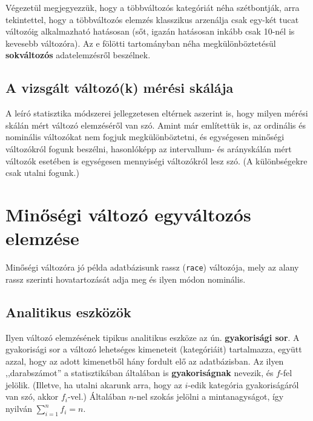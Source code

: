 \documentclass[]{book}
\begin{document}
Végezetül megjegyezzük, hogy a többváltozós kategóriát néha szétbontják, arra tekintettel, hogy a többváltozós elemzés klasszikus arzenálja csak egy-két tucat változóig alkalmazható hatásosan (sőt, igazán hatásosan inkább csak 10-nél is kevesebb változóra). Az e fölötti tartományban néha megkülönböztetésül \textbf{sokváltozós} adatelemzésről beszélnek.

\hypertarget{deskriptivcsoportositasmeresiskala}{%
\subsection{A vizsgált változó(k) mérési skálája}\label{deskriptivcsoportositasmeresiskala}}

A leíró statisztika módszerei jellegzetesen eltérnek aszerint is, hogy milyen mérési skálán mért változó elemzéséről van szó. Amint már említettük is, az ordinális és nominális változókat nem fogjuk megkülönböztetni, és egységesen minőségi változókról fogunk beszélni, hasonlóképp az intervallum- és arányskálán mért változók esetében is egységesen mennyiségi változókról lesz szó. (A különbségekre csak utalni fogunk.)

\hypertarget{deskriptivminegyvalt}{%
\section{Minőségi változó egyváltozós elemzése}\label{deskriptivminegyvalt}}

Minőségi változóra jó példa adatbázisunk rassz (\texttt{race}) változója, mely az alany rassz szerinti hovatartozását adja meg és ilyen módon nominális.

\hypertarget{deskriptivmonegyvaltanalitikus}{%
\subsection{Analitikus eszközök}\label{deskriptivmonegyvaltanalitikus}}

Ilyen változó elemzésének tipikus analitikus eszköze az ún. \textbf{gyakorisági sor}. A gyakorisági sor a változó lehetséges kimeneteit (kategóriáit) tartalmazza, együtt azzal, hogy az adott kimenetből hány fordult elő az adatbázisban. Az ilyen ,,darabszámot'' a statisztikában általában is \textbf{gyakoriságnak} nevezik, és \(f\)-fel jelölik. (Illetve, ha utalni akarunk arra, hogy az \(i\)-edik kategória gyakoriságáról van szó, akkor \(f_i\)-vel.) Általában \(n\)-nel szokás jelölni a mintanagyságot, így nyilván \(\sum_{i=1}^n f_i = n\).
\end{document}
